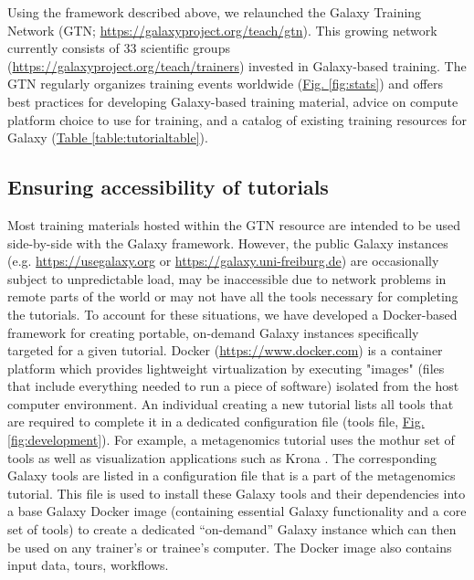 Using the framework described above, we relaunched the Galaxy Training Network (GTN; \url{https://galaxyproject.org/teach/gtn}). This growing network currently consists of 33 scientific groups (\url{https://galaxyproject.org/teach/trainers}) invested in Galaxy-based training. The GTN regularly organizes training events worldwide (\hyperref[fig:stats]{Fig. \ref{fig:stats}}) and offers best practices for developing Galaxy-based training material, advice on compute platform choice to use for training, and a catalog of existing training resources for Galaxy (\hyperref[table:tutorialtable]{Table \ref{table:tutorialtable}}).

\subsection*{Ensuring accessibility of tutorials}
Most training materials hosted within the GTN resource are intended to be used side-by-side with the Galaxy framework. However, the public Galaxy instances (e.g. \url{https://usegalaxy.org} or \url{https://galaxy.uni-freiburg.de}) are occasionally subject to unpredictable load, may be inaccessible due to network problems in remote parts of the world or may not have all the tools necessary for completing the tutorials. To account for these situations, we have developed a Docker-based framework for creating portable, on-demand Galaxy instances specifically targeted for a given tutorial. Docker (\url{https://www.docker.com}) is a container platform which provides lightweight virtualization by executing "images" (files that include everything needed to run a piece of software) isolated from the host computer environment. An individual creating a new tutorial lists all tools that are required to complete it in a dedicated configuration file (tools file, \hyperref[fig:development]{Fig. \ref{fig:development}}). For example, a metagenomics tutorial uses the mothur \cite{schloss2009introducing} set of tools as well as visualization applications such as Krona \cite{ondov2015krona}. The corresponding Galaxy tools are listed in a configuration file that is a part of the metagenomics tutorial. This file is used to install these Galaxy tools and their dependencies into a base Galaxy Docker image (containing essential Galaxy functionality and a core set of tools) to create a dedicated “on-demand” Galaxy instance which can then be used on any trainer’s or trainee’s computer. The Docker image also contains input data, tours, workflows.

